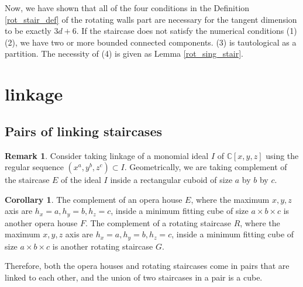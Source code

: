 \documentclass{amsart}[10pt]
\newcommand{\Ytodo}[1]{\todo[color=teal!40,bordercolor=teal,size=\footnotesize]{\textbf{Todo: }#1}}
\newcommand{\rtodo}[1]{\todo[color=orange!40,bordercolor=teal,size=\footnotesize]{\textbf{Todo: }#1}}
\theoremstyle{plain}
\theoremstyle{definition}
\newtheorem{corollary}[theorem]{Corollary}
\newtheorem{remark}[theorem]{Remark}
\newtheorem{definition}[theorem]{Definition}
\begin{document}
Now, we have shown that all of the four conditions in the Definition \ref{rot_stair_def} of the rotating walls part are necessary for the tangent dimension to be exactly $3d+6$. If the staircase does not satisfy the numerical conditions (1)(2), we have two or more bounded connected components. (3) is tautological as a partition. The necessity of (4) is given as Lemma \ref{rot_sing_stair}.






\section{linkage}


\subsection{Pairs of linking staircases}


\begin{remark}
\label{linkedincube}
Consider taking linkage of a monomial ideal $I$ of $\mathbb{C}[x,y,z]$ using the regular sequence $(x^a,y^b,z^c) \subset I$. Geometrically, we are taking complement of the staircase $E$ of the ideal $I$ inside a rectangular cuboid of size $a$ by $b$ by $c$. %
\end{remark}


\begin{corollary}
\label{cor_linkage_pairs}
The complement of an opera house $E$, where the maximum $x,y,z$ axis are $h_x=a, h_y=b, h_z=c$, inside a minimum fitting cube of size $a \times b \times c$ is another opera house $F$. The complement of a rotating staircase $R$, where the maximum $x,y,z$ axis are $h_x=a, h_y=b, h_z=c$, inside a minimum fitting cube of size $a \times b \times c$ is another rotating staircase $G$.

Therefore, both the opera houses and rotating staircases come in pairs that are linked to each other, and the union of two staircases in a pair is a cube.    
\end{corollary}
\end{document}
